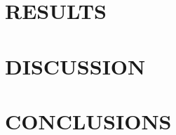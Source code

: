 \documentclass[preprint2]{aastex}              %
\begin{document}
\section{RESULTS} \label{sec:Results}




\section{DISCUSSION}



\section{CONCLUSIONS}






\appendix
\twocolumn
\appendixpage

\end{document}
